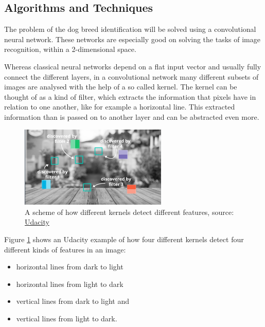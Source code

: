 \documentclass[paper=A4, DIV=10, parskip=half]{scrartcl}
\begin{document}

\subsection*{Algorithms and Techniques}

The problem of the dog breed identification will be solved using a convolutional
neural network. These networks are especially good on solving the tasks of image
recognition, within a 2-dimensional space. 

Whereas classical neural networks depend on a flat input vector and usually
fully connect the different layers, in a convolutional network many different
subsets of images are analysed with the help of a so called kernel. The kernel
can be thought of as a kind of filter, which extracts the information that
pixels have in relation to one another, like for example a horizontal line. This
extracted information than is passed on to another layer and can be abstracted
even more.

\begin{figure}[H]
  \centering
  \includegraphics[width=7cm]{images/different_kernels.png}
\caption{A scheme of how different kernels detect different features, source:
\href{https://youtu.be/RnM1D-XI--8?t=181}{Udacity}}
  \label{different_kernels}
\end{figure}

Figure \ref{different_kernels} shows an Udacity example of how four different
kernels detect four different kinds of features in an image:
\begin{itemize}
  \item horizontal lines from dark to light
  \item horizontal lines from light to dark
  \item vertical lines from dark to light and
  \item vertical lines from light to dark.
\end{itemize}
\end{document}
